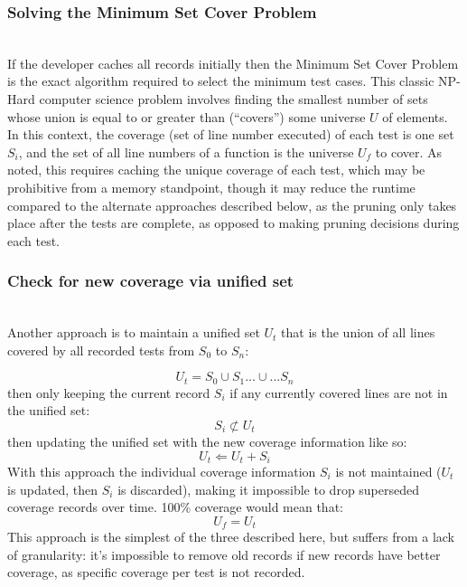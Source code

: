  \subsubsection{Solving the Minimum Set Cover Problem}\label{sec:tuning-2}
 \hfill\\
If the developer caches all records initially then the Minimum Set Cover Problem
\cite{hassin2005better} is the exact algorithm required to select the minimum test cases.
This classic NP-Hard computer science problem involves finding the smallest number
  of sets whose union is equal to or greater than (“covers”) some universe $U$ of elements.  
  In this context, the coverage (set of line number executed) of each test is one set $S_i$,
 and the set of all line numbers of a function is the universe $U_f$ to cover.  
 As noted, this requires caching the unique coverage of each test, which may 
 be prohibitive from a memory standpoint, though it may reduce the runtime 
 compared to the alternate approaches described below, as the pruning 
 only takes place after the tests are complete, as opposed to making 
 pruning decisions during each test.

\subsubsection{Check for new coverage via unified set}\label{sec:tuning-2}
\hfill\\
Another approach is to maintain a unified set $U_t$ that is the union of all lines 
covered by all recorded tests from $S_0$ to $S_n$: 

\begin{equation*}
  U_t = S_0 \cup S_1 ...\cup... S_n
\end{equation*}
then only keeping the current record $S_i$ if any currently 
covered lines are not in the unified set:
\begin{equation*}
  S_i \not \subset U_t
\end{equation*}
then updating the unified set with the new coverage information like so:
\begin{equation*}
  U_t \Leftarrow U_t + S_i
\end{equation*} 
With this approach the individual coverage information $S_i$ is not maintained 
($U_t$ is updated, then $S_i$ is discarded), making it impossible to drop superseded 
coverage records over time.  100\% coverage would mean that:
\begin{equation*}
  U_f = U_t
\end{equation*} 
This approach is the simplest of the three described here, but suffers from a 
lack of granularity: it's impossible to remove old records if new records have 
better coverage, as specific coverage per test is not recorded.

